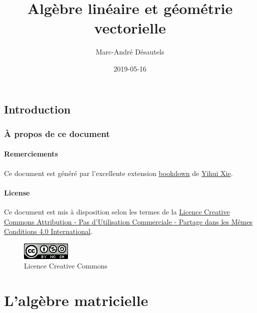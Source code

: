 \documentclass[]{book}
\title{Algèbre linéaire et géométrie vectorielle}
\author{Marc-André Désautels}
\date{2019-05-16}
\theoremstyle{definition}
\theoremstyle{definition}
\theoremstyle{definition}
\theoremstyle{remark}
\begin{document}
\maketitle

{
\setcounter{tocdepth}{2}
\tableofcontents
}
\hypertarget{introduction}{%
\chapter*{Introduction}\label{introduction}}

\hypertarget{a-propos-de-ce-document}{%
\section*{À propos de ce document}\label{a-propos-de-ce-document}}

\hypertarget{remerciements}{%
\subsection*{Remerciements}\label{remerciements}}

Ce document est généré par l'excellente extension \href{https://bookdown.org/}{bookdown} de \href{https://yihui.name/}{Yihui Xie}.

\hypertarget{license}{%
\subsection*{License}\label{license}}

Ce document est mis à disposition selon les termes de la \href{http://creativecommons.org/licenses/by-nc-sa/4.0/}{Licence Creative Commons Attribution - Pas d'Utilisation Commerciale - Partage dans les Mêmes Conditions 4.0 International}.

\begin{figure}
\centering
\includegraphics{resources/icons/license_cc.png}
\caption{Licence Creative Commons}
\end{figure}

\hypertarget{part-lalgebre-matricielle}{%
\part{L'algèbre matricielle}\label{part-lalgebre-matricielle}}
\end{document}
